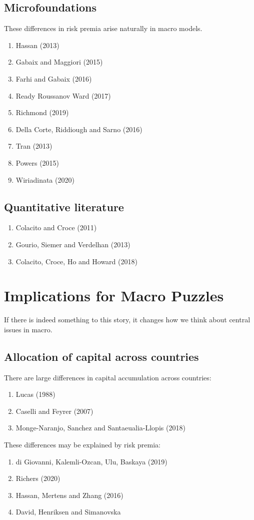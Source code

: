 \documentclass[12pt,letter]{article}
\theoremstyle{break} \theorembodyfont{\normalfont\itshape}
\theoremstyle{break}
\theoremstyle{break} \theorembodyfont{\normalfont\itshape}
\theoremstyle{break} \theorembodyfont{\normalfont\itshape}
\begin{document}
\subsection{Microfoundations}
These differences in risk premia arise naturally in macro models.
\begin{enumerate}
\item Hassan (2013)
\item Gabaix and Maggiori (2015)
\item Farhi and Gabaix (2016)
\item Ready Roussanov Ward (2017)
\item Richmond (2019)
\item Della Corte, Riddiough and Sarno (2016)
\item Tran (2013)
\item Powers (2015)
\item Wiriadinata (2020)
\end{enumerate}

\subsection{Quantitative literature}
\begin{enumerate}
\item Colacito and Croce (2011)
\item Gourio, Siemer and Verdelhan (2013)
\item Colacito, Croce, Ho and Howard (2018)
\end{enumerate}


\section{Implications for Macro Puzzles}
If there is indeed something to this story, it changes how we think
about central issues in macro.

\subsection{Allocation of capital across countries}
There are large differences in capital accumulation across countries:
\begin{enumerate}
\item Lucas (1988)
\item Caselli and Feyrer (2007)
\item Monge-Naranjo, Sanchez and Santaeualia-Llopis (2018)
\end{enumerate}
These differences may be explained by risk premia:
\begin{enumerate}
\item di Giovanni, Kalemli-Ozcan, Ulu, Baskaya (2019)
\item Richers (2020)
\item Hassan, Mertens and Zhang (2016)
\item David, Henriksen and Simanovska
\end{enumerate}
\end{document}

